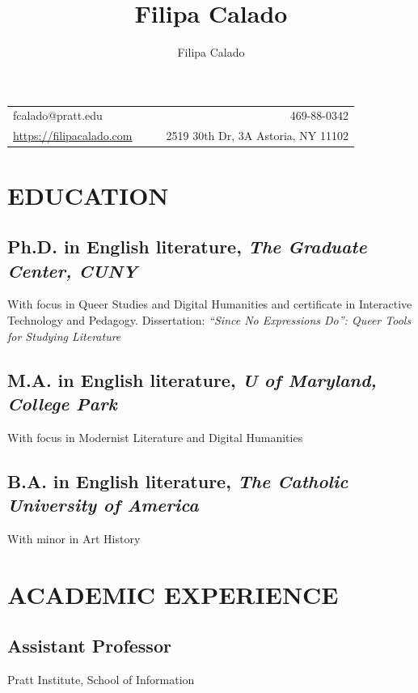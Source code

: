 \documentclass[a4paper,11pt]{article}
\author{Filipa Calado}
\date{}
\title{Filipa Calado}
\renewcommand{\maketitle}{{\centering {\color{myaccent}\huge\bfseries\theauthor}\par \vspace{4pt}}}
\begin{document}
\maketitle
\begin{center}
\begin{tabular}{lllr}
fcalado@pratt.edu &  &  & 469-88-0342\\[0pt]
\url{https://filipacalado.com} &  &  & 2519 30th Dr, 3A Astoria, NY 11102\\[0pt]
\end{tabular}
\end{center}


\section*{EDUCATION}
\label{sec:org44b261e}
\subsection*{Ph.D. in English literature, \emph{The Graduate Center, CUNY}  \hfill{}   }
\label{sec:org25ea54f}
With focus in Queer Studies and Digital Humanities and certificate in
  Interactive Technology and Pedagogy. Dissertation: \emph{``Since No
  Expressions Do'': Queer Tools for Studying Literature}
\subsection*{M.A. in English literature, \emph{U of Maryland, College Park}  \hfill{}   }
\label{sec:org50435d9}
With focus in Modernist Literature and Digital Humanities
\subsection*{B.A. in English literature, \emph{The Catholic University of America}  \hfill{}   }
\label{sec:org05759ee}
With minor in Art History
\section*{ACADEMIC EXPERIENCE}
\label{sec:org0f86cf8}
\subsection*{Assistant Professor  \hfill{}   }
\label{sec:org7f97612}
Pratt Institute, School of Information 
\end{document}
